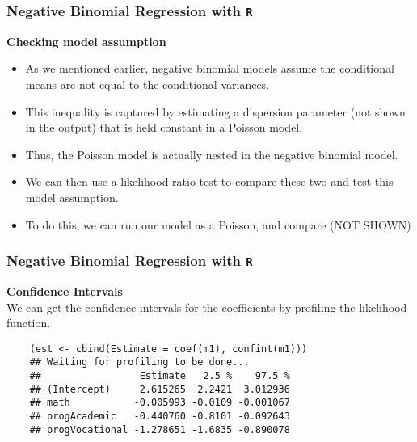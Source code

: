 \documentclass[MASTER.tex]{subfiles}
\begin{document}
\begin{frame}[fragile]
	\frametitle{Negative Binomial Regression with \texttt{R} }
	\Large
	
	\textbf{Checking model assumption}
\begin{itemize}
	\item	
	As we mentioned earlier, negative binomial models assume the conditional means are not equal to the conditional 
	variances. 
	\item This inequality is captured by estimating a dispersion parameter (not shown in the output) that is held
	constant in a Poisson model. 
	\item Thus, the Poisson model is actually nested in the negative binomial model. 
	\item We can then use a likelihood ratio test to compare these two and test this model assumption. 
	\item To do this, we can run our model as a Poisson, and compare (NOT SHOWN)
\end{itemize}
\end{frame}
\begin{frame}[fragile]
	\frametitle{Negative Binomial Regression with \texttt{R} }
	\large
	\textbf{Confidence Intervals}\\
	We can get the confidence intervals for the coefficients by profiling the likelihood function.
	\begin{verbatim}
	(est <- cbind(Estimate = coef(m1), confint(m1)))
	## Waiting for profiling to be done...
	##                 Estimate   2.5 %    97.5 %
	## (Intercept)     2.615265  2.2421  3.012936
	## math           -0.005993 -0.0109 -0.001067
	## progAcademic   -0.440760 -0.8101 -0.092643
	## progVocational -1.278651 -1.6835 -0.890078
	\end{verbatim}
	
\end{frame}
\end{document}
